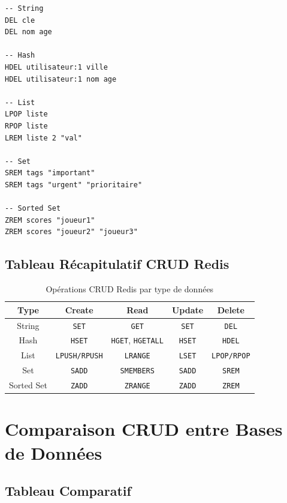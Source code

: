 \documentclass[11pt,a4paper]{article}
\begin{document}
\begin{lstlisting}
-- String
DEL cle
DEL nom age

-- Hash
HDEL utilisateur:1 ville
HDEL utilisateur:1 nom age

-- List
LPOP liste
RPOP liste
LREM liste 2 "val"

-- Set
SREM tags "important"
SREM tags "urgent" "prioritaire"

-- Sorted Set
ZREM scores "joueur1"
ZREM scores "joueur2" "joueur3"
\end{lstlisting}

\subsection{Tableau Récapitulatif CRUD Redis}

\begin{table}[h]
\centering
\begin{tabular}{|c|c|c|c|c|}
\hline
\textbf{Type} & \textbf{Create} & \textbf{Read} & \textbf{Update} & \textbf{Delete} \\
\hline
String & \texttt{SET} & \texttt{GET} & \texttt{SET} & \texttt{DEL} \\
\hline
Hash & \texttt{HSET} & \texttt{HGET}, \texttt{HGETALL} & \texttt{HSET} & \texttt{HDEL} \\
\hline
List & \texttt{LPUSH/RPUSH} & \texttt{LRANGE} & \texttt{LSET} & \texttt{LPOP/RPOP} \\
\hline
Set & \texttt{SADD} & \texttt{SMEMBERS} & \texttt{SADD} & \texttt{SREM} \\
\hline
Sorted Set & \texttt{ZADD} & \texttt{ZRANGE} & \texttt{ZADD} & \texttt{ZREM} \\
\hline
\end{tabular}
\caption{Opérations CRUD Redis par type de données}
\end{table}

\newpage

\section{Comparaison CRUD entre Bases de Données}

\subsection{Tableau Comparatif}
\end{document}

